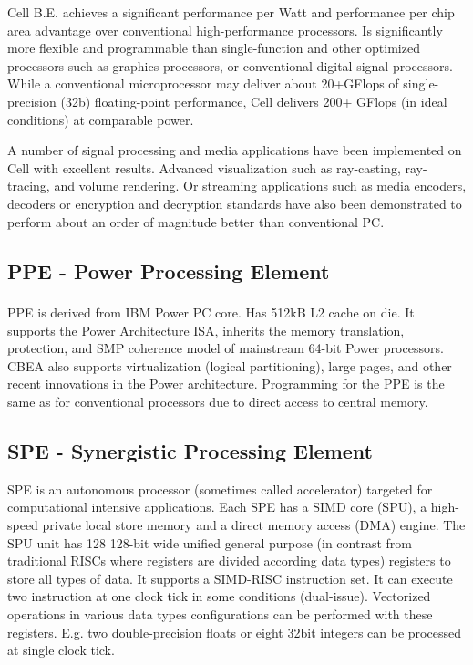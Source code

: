 Cell B.E. achieves a significant performance per Watt and performance per chip area advantage over conventional high-performance processors.
Is significantly more flexible and programmable than single-function and other optimized processors such as graphics processors, or conventional digital signal processors.
While a conventional microprocessor may deliver about 20+GFlops of single-precision (32b) floating-point performance, Cell delivers 200+ GFlops (in ideal conditions) at comparable power.

A number of signal processing and media applications have been implemented on Cell with excellent results.
Advanced visualization such as ray-casting, ray-tracing, and volume rendering.
Or streaming applications such as media encoders, decoders or encryption and decryption standards have also been demonstrated to perform about an order of magnitude better than conventional PC.


\subsection{PPE - Power Processing Element}
PPE is derived from IBM Power PC\textsuperscript{\textregistered} core. Has 512kB L2 cache on die.
It supports the Power Architecture ISA, inherits the memory translation, protection, and SMP coherence model of mainstream 64-bit Power processors.
CBEA also supports virtualization (logical partitioning), large pages, and other recent innovations in the Power architecture.
Programming for the PPE is the same as for conventional processors due to direct access to central memory.

\subsection{SPE - Synergistic Processing Element}

\par
SPE is an autonomous processor (sometimes called accelerator) targeted for computational intensive applications.
Each SPE has a SIMD core (SPU), a high-speed private local store memory and a direct memory access (DMA) engine.
The SPU unit has 128 128-bit wide unified general purpose (in contrast from traditional RISCs where registers are divided according data types) registers to store all types of data.
It supports a SIMD-RISC instruction set.
It can execute two instruction at one clock tick in some conditions (dual-issue).
Vectorized operations in various data types configurations can be performed with these registers.
E.g. two double-precision floats or eight 32bit integers can be processed at single clock tick.

